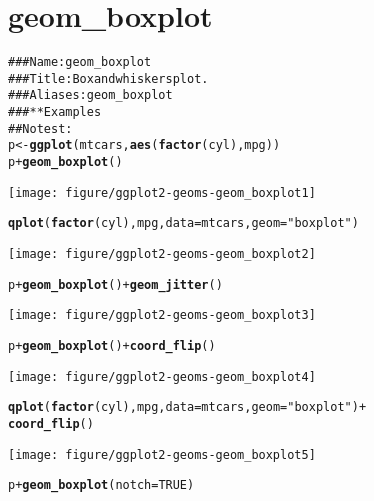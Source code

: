 \documentclass[a4paper,titlepage]{tufte-handout}\usepackage{graphicx, color}
\makeatletter
\def\maxwidth{ %
  \ifdim\Gin@nat@width>\linewidth
    \linewidth
  \else
    \Gin@nat@width
  \fi
}
\newcommand{\hlfunctioncall}[1]{\textcolor[rgb]{0.501960784313725,0,0.329411764705882}{\textbf{#1}}}%
\newcommand{\hlstring}[1]{\textcolor[rgb]{0.6,0.6,1}{#1}}%
\newcommand{\hlcomment}[1]{\textcolor[rgb]{0.180392156862745,0.6,0.341176470588235}{#1}}%
\newenvironment{kframe}{%
 \def\at@end@of@kframe{}%
 \ifinner\ifhmode%
  \def\at@end@of@kframe{\end{minipage}}%
  \begin{minipage}{\columnwidth}%
 \fi\fi%
 \def\FrameCommand##1{\hskip\@totalleftmargin \hskip-\fboxsep
 \colorbox{shadecolor}{##1}\hskip-\fboxsep
     \hskip-\linewidth \hskip-\@totalleftmargin \hskip\columnwidth}%
 \MakeFramed {\advance\hsize-\width
   \@totalleftmargin\z@ \linewidth\hsize
   \@setminipage}}%
 {\par\unskip\endMakeFramed%
 \at@end@of@kframe}
\newenvironment{knitrout}{}{} %
\makeatother
\begin{document}
\section{geom\_boxplot}

\begin{knitrout}
\color{fgcolor}\begin{kframe}
\begin{alltt}
\hlcomment{### Name: geom_boxplot}
\hlcomment{### Title: Box and whiskers plot.}
\hlcomment{### Aliases: geom_boxplot}
\hlcomment{### ** Examples}
\hlcomment{## No test: }
p <- \hlfunctioncall{ggplot}(mtcars, \hlfunctioncall{aes}(\hlfunctioncall{factor}(cyl), mpg))
p + \hlfunctioncall{geom_boxplot}()
\end{alltt}
\end{kframe}\texttt{[image: figure/ggplot2-geoms-geom\_boxplot1]} \begin{kframe}\begin{alltt}
\hlfunctioncall{qplot}(\hlfunctioncall{factor}(cyl), mpg, data = mtcars, geom = \hlstring{"boxplot"})
\end{alltt}
\end{kframe}\texttt{[image: figure/ggplot2-geoms-geom\_boxplot2]} \begin{kframe}\begin{alltt}
p + \hlfunctioncall{geom_boxplot}() + \hlfunctioncall{geom_jitter}()
\end{alltt}
\end{kframe}\texttt{[image: figure/ggplot2-geoms-geom\_boxplot3]} \begin{kframe}\begin{alltt}
p + \hlfunctioncall{geom_boxplot}() + \hlfunctioncall{coord_flip}()
\end{alltt}
\end{kframe}\texttt{[image: figure/ggplot2-geoms-geom\_boxplot4]} \begin{kframe}\begin{alltt}
\hlfunctioncall{qplot}(\hlfunctioncall{factor}(cyl), mpg, data = mtcars, geom = \hlstring{"boxplot"}) +
  \hlfunctioncall{coord_flip}()
\end{alltt}
\end{kframe}\texttt{[image: figure/ggplot2-geoms-geom\_boxplot5]} \begin{kframe}\begin{alltt}
p + \hlfunctioncall{geom_boxplot}(notch = TRUE)
\end{alltt}



\end{kframe}
\end{knitrout}
\end{document}
